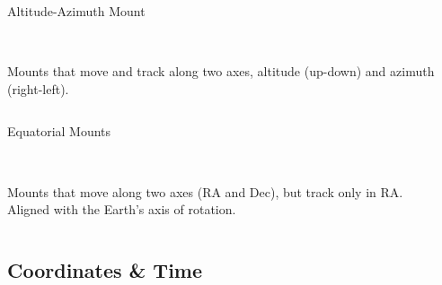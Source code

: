 
\begin{frame}{Altitude-Azimuth Mount}
  \begin{columns}[T,onlytextwidth]

    \centering

    \ \\[1ex]
      \Large
      Mounts that move and track along two axes, altitude (up-down) and azimuth (right-left).

  \end{columns}
\end{frame}


\begin{frame}{Equatorial Mounts}
  \begin{columns}[T,onlytextwidth]

    \centering

    \ \\[1ex]

      \Large
      Mounts that move along two axes (RA and Dec), but track only in RA. \\[1ex]

      Aligned with the Earth's axis of rotation.

  \end{columns}
\end{frame}


\subsection{Coordinates \& Time}

